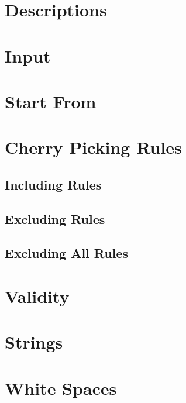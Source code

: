 \documentclass[10pt, a4paper]{article}
\begin{document}
    \section{Descriptions}
    
    
    \section{Input}
    
    \clearpage
    
    \section{Start From}
    \label{sub:Start-From}
    
    
    \section{Cherry Picking Rules}
    
    
    \subsection{Including Rules}
    
    
    \subsection{Excluding Rules}
    
    
    \subsection{Excluding All Rules}
    
    \clearpage
    
    \section{Validity}
    

    \section{Strings}
    
    
    \section{White Spaces}
    
\end{document}
